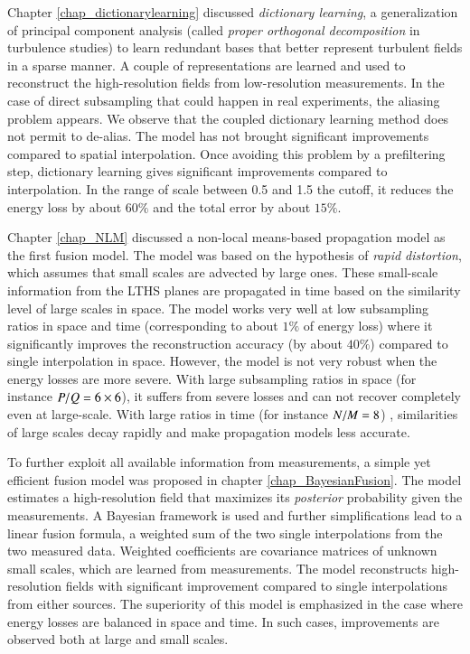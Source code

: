 Chapter \ref{chap_dictionarylearning} discussed \textit{dictionary learning}, a generalization of principal component analysis (called \textit{proper orthogonal decomposition} in turbulence studies) to learn redundant bases that better represent turbulent fields in a sparse manner. A couple of representations are learned and used to reconstruct the high-resolution fields from low-resolution measurements. In the case of direct subsampling that could happen in real experiments, the aliasing problem appears. We observe that the coupled dictionary learning method does not permit to de-alias. The model has not brought significant improvements compared to spatial interpolation. Once avoiding this problem by a prefiltering step, dictionary learning gives significant improvements compared to interpolation. In the range of scale between 0.5 and 1.5 the cutoff, it reduces the energy loss by about $ 60 \% $ and the total error by about $ 15 \% $. 

Chapter \ref{chap_NLM} discussed a non-local means-based propagation model as the first fusion model. The model was based on the hypothesis of \textit{rapid distortion}, which assumes that small scales are advected by large ones. These small-scale information from the LTHS planes are propagated in time based on the similarity level of large scales in space. The model works very well at low subsampling ratios in space and time (corresponding to about $ 1\% $ of energy loss) where it significantly improves the reconstruction accuracy (by about $ 40\% $) compared to single interpolation in space. However, the model is not very robust when the energy losses are more severe. With large subsampling ratios in space (for instance $ P/Q =6 \times 6 $), it suffers from severe losses and can not recover completely even at large-scale. With large ratios in time (for instance $ N/M = 8 $) , similarities of large scales decay rapidly and make propagation models less accurate.

To further exploit all available information from measurements, a simple yet efficient fusion model was proposed in chapter \ref{chap_BayesianFusion}. The model estimates a high-resolution field that maximizes its \textit{posterior} probability given the measurements. A Bayesian framework is used and further simplifications lead to a linear fusion formula, a weighted sum of the two single interpolations from the two measured data. Weighted coefficients are covariance matrices of unknown small scales, which are learned from measurements. The model reconstructs high-resolution fields with significant improvement compared to single interpolations from either sources. The superiority of this model is emphasized in the case where energy losses are balanced in space and time. In such cases, improvements are observed both at large and small scales.

